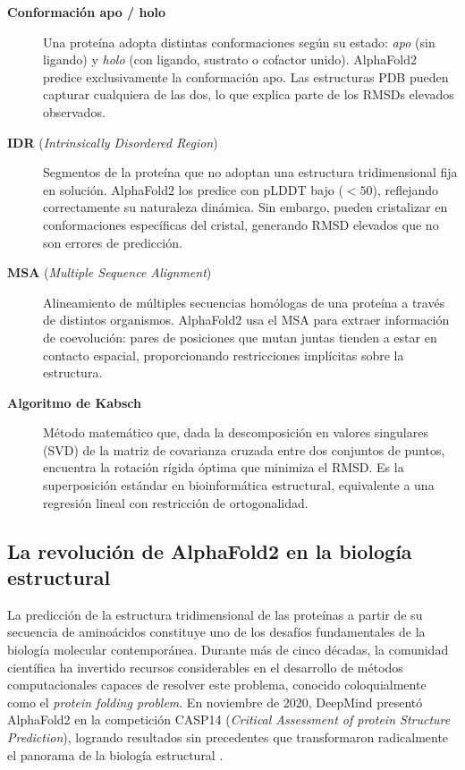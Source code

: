 \begin{description}
    \item[\textbf{Conformaci\'on apo / holo}]
    Una prote\'ina adopta distintas conformaciones seg\'un su estado: \emph{apo}
    (sin ligando) y \emph{holo} (con ligando, sustrato o cofactor unido).
    AlphaFold2 predice exclusivamente la conformaci\'on apo. Las estructuras PDB pueden
    capturar cualquiera de las dos, lo que explica parte de los RMSDs elevados observados.

    \item[\textbf{IDR} (\textit{Intrinsically Disordered Region})]
    Segmentos de la prote\'ina que no adoptan una estructura tridimensional fija en
    soluci\'on. AlphaFold2 los predice con pLDDT bajo ($<50$), reflejando correctamente
    su naturaleza din\'amica. Sin embargo, pueden cristalizar en conformaciones
    espec\'ificas del cristal, generando RMSD elevados que no son errores de predicci\'on.

    \item[\textbf{MSA} (\textit{Multiple Sequence Alignment})]
    Alineamiento de m\'ultiples secuencias homólogas de una prote\'ina a trav\'es de
    distintos organismos. AlphaFold2 usa el MSA para extraer informaci\'on de
    coevoluci\'on: pares de posiciones que mutan juntas tienden a estar en contacto
    espacial, proporcionando restricciones impl\'icitas sobre la estructura.

    \item[\textbf{Algoritmo de Kabsch}]
    M\'etodo matem\'atico que, dada la descomposici\'on en valores singulares (SVD) de
    la matriz de covarianza cruzada entre dos conjuntos de puntos, encuentra la rotaci\'on
    r\'igida \'optima que minimiza el RMSD. Es la superposici\'on est\'andar en
    bioinform\'atica estructural, equivalente a una regresi\'on lineal con restricci\'on
    de ortogonalidad.

\end{description}

\subsection{La revoluci\'on de AlphaFold2 en la biolog\'ia estructural}
\label{subsec:revolucion_alphafold}

La predicci\'on de la estructura tridimensional de las prote\'inas a partir de su secuencia de amino\'acidos constituye uno de los desaf\'ios fundamentales de la biolog\'ia molecular contempor\'anea. Durante m\'as de cinco d\'ecadas, la comunidad cient\'ifica ha invertido recursos considerables en el desarrollo de m\'etodos computacionales capaces de resolver este problema, conocido coloquialmente como el \textit{protein folding problem}. En noviembre de 2020, DeepMind present\'o AlphaFold2 en la competici\'on CASP14 (\textit{Critical Assessment of protein Structure Prediction}), logrando resultados sin precedentes que transformaron radicalmente el panorama de la biolog\'ia estructural \citep{jumper2021highly}.

